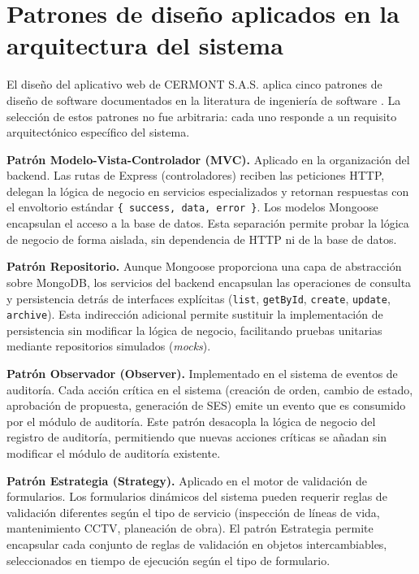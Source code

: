 \section{Patrones de diseño aplicados en la arquitectura del sistema}
\label{sec:patrones-diseno}

El diseño del aplicativo web de CERMONT S.A.S. aplica cinco patrones de diseño de software documentados en la literatura de ingeniería de software \cite{gamma1994,fowler2002}. La selección de estos patrones no fue arbitraria: cada uno responde a un requisito arquitectónico específico del sistema.

\textbf{Patrón Modelo-Vista-Controlador (MVC).} Aplicado en la organización del backend. Las rutas de Express (controladores) reciben las peticiones HTTP, delegan la lógica de negocio en servicios especializados y retornan respuestas con el envoltorio estándar \texttt{\{ success, data, error \}}. Los modelos Mongoose encapsulan el acceso a la base de datos. Esta separación permite probar la lógica de negocio de forma aislada, sin dependencia de HTTP ni de la base de datos.

\textbf{Patrón Repositorio.} Aunque Mongoose proporciona una capa de abstracción sobre MongoDB, los servicios del backend encapsulan las operaciones de consulta y persistencia detrás de interfaces explícitas (\texttt{list}, \texttt{getById}, \texttt{create}, \texttt{update}, \texttt{archive}). Esta indirección adicional permite sustituir la implementación de persistencia sin modificar la lógica de negocio, facilitando pruebas unitarias mediante repositorios simulados (\textit{mocks}).

\textbf{Patrón Observador (Observer).} Implementado en el sistema de eventos de auditoría. Cada acción crítica en el sistema (creación de orden, cambio de estado, aprobación de propuesta, generación de SES) emite un evento que es consumido por el módulo de auditoría. Este patrón desacopla la lógica de negocio del registro de auditoría, permitiendo que nuevas acciones críticas se añadan sin modificar el módulo de auditoría existente.

\textbf{Patrón Estrategia (Strategy).} Aplicado en el motor de validación de formularios. Los formularios dinámicos del sistema pueden requerir reglas de validación diferentes según el tipo de servicio (inspección de líneas de vida, mantenimiento CCTV, planeación de obra). El patrón Estrategia permite encapsular cada conjunto de reglas de validación en objetos intercambiables, seleccionados en tiempo de ejecución según el tipo de formulario.

